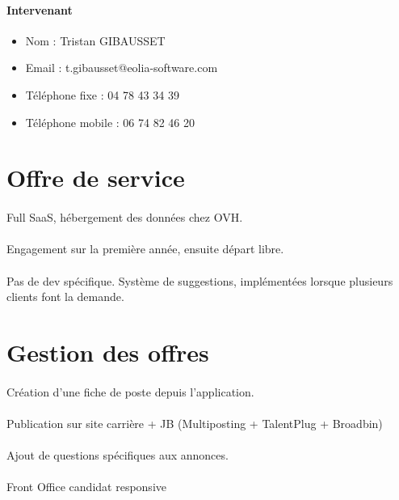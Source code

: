 \paragraph{Intervenant}
\begin{itemize}
	\item Nom : Tristan GIBAUSSET
	\item Email : t.gibausset@eolia-software.com
	\item Téléphone fixe : 04 78 43 34 39
	\item Téléphone mobile : 06 74 82 46 20  
\end{itemize}


\section{Offre de service}
\paragraph{} Full SaaS, hébergement des données chez OVH.
\paragraph{} Engagement sur la première année, ensuite départ libre.
\paragraph{} Pas de dev spécifique. Système de suggestions, implémentées lorsque plusieurs clients font la demande.

\section{Gestion des offres}
\paragraph{} Création d'une fiche de poste depuis l'application.
\paragraph{} Publication sur site carrière + JB (Multiposting + TalentPlug + Broadbin)
\paragraph{} Ajout de questions spécifiques aux annonces.
\paragraph{} Front Office candidat responsive
